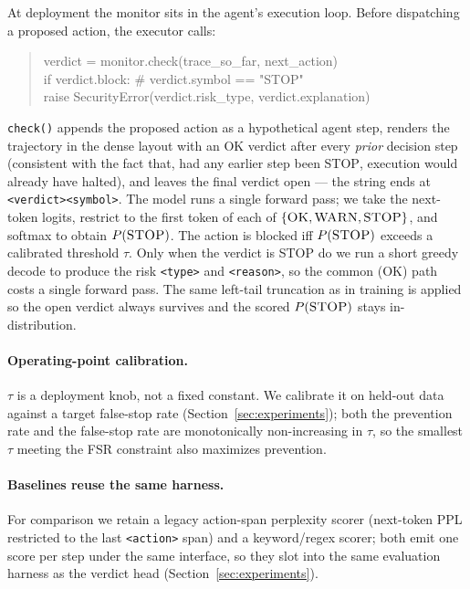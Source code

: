 At deployment the monitor sits in the agent's execution loop. Before dispatching
a proposed action, the executor calls:
\begin{quote}\small\ttfamily
verdict = monitor.check(trace\_so\_far, next\_action)\\
if verdict.block:  \# verdict.symbol == "STOP"\\
\hphantom{xx}raise SecurityError(verdict.risk\_type, verdict.explanation)
\end{quote}
\texttt{check()} appends the proposed action as a hypothetical agent step,
renders the trajectory in the dense layout with an \textsc{OK} verdict after
every \emph{prior} decision step (consistent with the fact that, had any earlier
step been \textsc{STOP}, execution would already have halted), and leaves the
final verdict open --- the string ends at \texttt{<verdict><symbol>}. The model
runs a single forward pass; we take the next-token logits, restrict to the first
token of each of $\{\textsc{OK},\textsc{WARN},\textsc{STOP}\}$, and softmax to
obtain $P(\textsc{STOP})$. The action is blocked iff $P(\textsc{STOP})$ exceeds a
calibrated threshold $\tau$. Only when the verdict is \textsc{STOP} do we run a
short greedy decode to produce the risk \texttt{<type>} and \texttt{<reason>}, so
the common (\textsc{OK}) path costs a single forward pass. The same left-tail
truncation as in training is applied so the open verdict always survives and the
scored $P(\textsc{STOP})$ stays in-distribution.

\paragraph{Operating-point calibration.}
$\tau$ is a deployment knob, not a fixed constant. We calibrate it on held-out
data against a target false-stop rate (Section~\ref{sec:experiments}); both the
prevention rate and the false-stop rate are monotonically non-increasing in
$\tau$, so the smallest $\tau$ meeting the FSR constraint also maximizes
prevention.

\paragraph{Baselines reuse the same harness.}
For comparison we retain a legacy action-span perplexity scorer (next-token PPL
restricted to the last \texttt{<action>} span) and a keyword/regex scorer; both
emit one score per step under the same interface, so they slot into the same
evaluation harness as the verdict head (Section~\ref{sec:experiments}).
